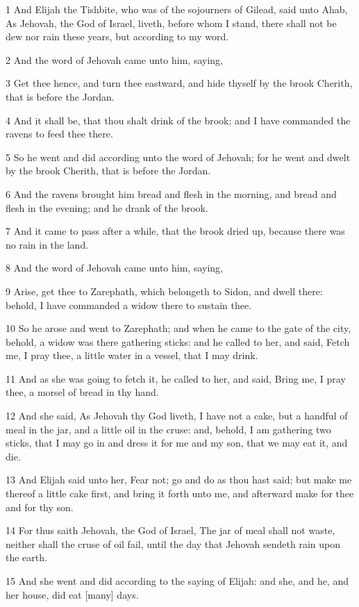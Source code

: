 \par 1 And Elijah the Tishbite, who was of the sojourners of Gilead, said unto Ahab, As Jehovah, the God of Israel, liveth, before whom I stand, there shall not be dew nor rain these years, but according to my word.
\par 2 And the word of Jehovah came unto him, saying,
\par 3 Get thee hence, and turn thee eastward, and hide thyself by the brook Cherith, that is before the Jordan.
\par 4 And it shall be, that thou shalt drink of the brook; and I have commanded the ravens to feed thee there.
\par 5 So he went and did according unto the word of Jehovah; for he went and dwelt by the brook Cherith, that is before the Jordan.
\par 6 And the ravens brought him bread and flesh in the morning, and bread and flesh in the evening; and he drank of the brook.
\par 7 And it came to pass after a while, that the brook dried up, because there was no rain in the land.
\par 8 And the word of Jehovah came unto him, saying,
\par 9 Arise, get thee to Zarephath, which belongeth to Sidon, and dwell there: behold, I have commanded a widow there to sustain thee.
\par 10 So he arose and went to Zarephath; and when he came to the gate of the city, behold, a widow was there gathering sticks: and he called to her, and said, Fetch me, I pray thee, a little water in a vessel, that I may drink.
\par 11 And as she was going to fetch it, he called to her, and said, Bring me, I pray thee, a morsel of bread in thy hand.
\par 12 And she said, As Jehovah thy God liveth, I have not a cake, but a handful of meal in the jar, and a little oil in the cruse: and, behold, I am gathering two sticks, that I may go in and dress it for me and my son, that we may eat it, and die.
\par 13 And Elijah said unto her, Fear not; go and do as thou hast said; but make me thereof a little cake first, and bring it forth unto me, and afterward make for thee and for thy son.
\par 14 For thus saith Jehovah, the God of Israel, The jar of meal shall not waste, neither shall the cruse of oil fail, until the day that Jehovah sendeth rain upon the earth.
\par 15 And she went and did according to the saying of Elijah: and she, and he, and her house, did eat [many] days.
